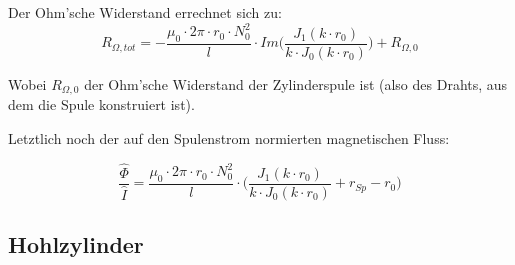 Der Ohm'sche Widerstand errechnet sich zu:
\begin{equation}
    \label{eq:vollzylinder:RExact}
    R_{\Omega,tot} = - \frac{\mu_0 \cdot 2\pi \cdot r_0 \cdot N_0^2}{l} \cdot Im \Biggl(\frac{J_1 (k \cdot r_0)}{k \cdot J_0 (k \cdot r_0)} \Biggr) + R_{\Omega,0}
\end{equation}

Wobei $R_{\Omega,0}$ der  Ohm'sche Widerstand der Zylinderspule  ist (also des
Drahts, aus dem die Spule konstruiert ist).

Letztlich noch der auf den Spulenstrom normierten magnetischen Fluss:

\begin{equation}
    \label{eq:vollzylinder:phiExact}
    \frac{\hat{\Phi}}{\hat{I}} = \frac{\mu_0 \cdot 2\pi \cdot r_0 \cdot N_0^2}{l} \cdot \Biggl(\frac{J_1 (k \cdot r_0)}{k \cdot J_0 (k \cdot r_0)} + r_{Sp} - r_0 \Biggr)
\end{equation}


\subsection{Hohlzylinder}
\label{sec:arbgru:subsec:hohlzyliner}


